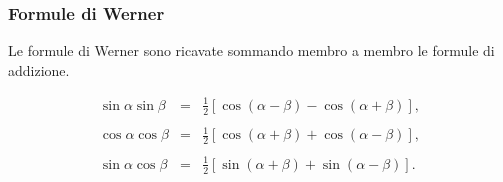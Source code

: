 \subsubsection{Formule di Werner}
Le formule di Werner sono ricavate sommando membro a membro le formule di addizione.

\begin{definition}
    \begin{equation*}
        \begin{matrix}
            \sin\alpha\sin\beta &=& \frac{1}{2}[\cos(\alpha-\beta)-\cos(\alpha+\beta)],\\\\
            \cos\alpha\cos\beta &=& \frac{1}{2}[\cos(\alpha+\beta)+\cos(\alpha-\beta)],\\\\
            \sin\alpha\cos\beta &=& \frac{1}{2}[\sin(\alpha+\beta)+\sin(\alpha-\beta)].
        \end{matrix}
    \end{equation*}
\end{definition}